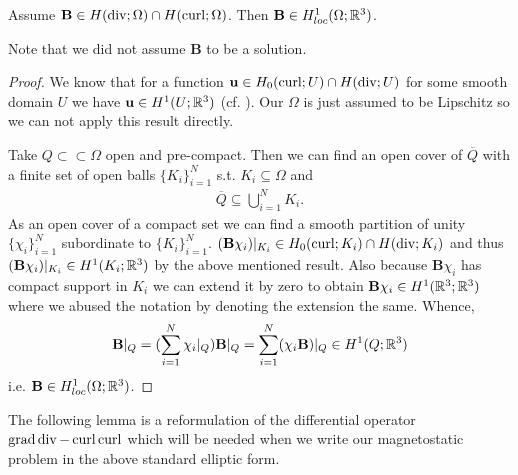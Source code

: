 \documentclass[../main.tex]{subfiles}
\begin{document}
\begin{theorem}\label{thm:solution_in_H1loc}
    Assume $\mathbf{B} \in H(\operatorname{div};\Omega) \cap H(\operatorname{curl};\Omega)$. Then 
    $\mathbf{B} \in H^1_{loc}(\Omega;\mathbb{R}^3)$.
\end{theorem}
\noindent Note that we did not assume $\mathbf{B}$ to be a solution.
\begin{proof}
    We know that for a function $\mathbf{u} \in H_0(\operatorname{curl};U) \cap H(\operatorname{div};U)$ 
    for some smooth domain $U$ we have $\mathbf{u} \in H^1(U;\mathbb{R}^3)$ 
    (cf. \cite[Remark 3.48]{monk}). Our $\Omega$ is just assumed to be Lipschitz 
    so we can not apply this result directly.

    Take $Q \subset\subset \Omega$ open and pre-compact. 
    Then we can find an open 
    cover of $\overline{Q}$ with a finite set of open balls $\{K_i\}_{i=1}^N$
    s.t. $K_i \subseteq \Omega$ and 
    \begin{align*}
        \overline{Q} \subseteq \bigcup\limits_{i=1}^N K_i.
    \end{align*}
    As an open cover of a compact set we can find a smooth partition of unity 
    $\{\chi_i\}_{i=1}^N$ subordinate to $\{K_i\}_{i=1}^N$. 
    $(\mathbf{B} \chi_i)|_{K_i} \in H_0(\operatorname{curl};K_i) \cap H(\operatorname{div};K_i)$ and thus 
    $(\mathbf{B} \chi_i)|_{K_i} \in H^1(K_i;\mathbb{R}^3)$ by the above mentioned result. 
    Also because $\mathbf{B} \chi_i$ has compact support in $K_i$ we can extend it by 
    zero to obtain
    $\mathbf{B} \chi_i \in H^1(\mathbb{R}^3;\mathbb{R}^3)$ where we abused the notation by denoting 
    the extension the same. Whence,
    \begin{align*}
        \mathbf{B}|_Q = \large( \sum\limits_{i=1}^N \chi_i |_Q \large) \mathbf{B}|_Q = 
        \sum\limits_{i=1}^N (\chi_i \mathbf{B})|_Q \in H^1(Q;\mathbb{R}^3)
    \end{align*}
    i.e. $\mathbf{B} \in H^1_{loc}(\Omega;\mathbb{R}^3)$.
\end{proof}

The following lemma is a reformulation of the differential operator 
$\operatorname{grad} \operatorname{div} - \operatorname{curl} \operatorname{curl}$ which will be needed when we write our 
magnetostatic problem in the above standard elliptic form.
\end{document}

